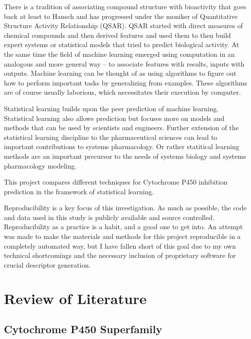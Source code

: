 There is a tradition of associating compound structure with bioactivity that goes back at least to Hansch\cite{Hansch1964} and has progressed under the moniker of Quantitative Structure Activity Relationship (QSAR). QSAR started with direct measures of chemical compounds and then derived features and used them to then build expert systems or statistical models that tried to predict biological activity. At the same time the field of machine learning emerged using computation in an analogous and more general way -- to associate features with results, inputs with outputs. Machine learning can be thought of as using algorithms to figure out how to perform important tasks by generalizing from examples. These algorithms are of course usually laborious, which necessitates their execution by computer.

Statistical learning builds upon the peer prediction of machine learning. Statistical learning also allows prediction but focuses more on models and methods that can be used by scientists and engineers.\cite{James2013} Further extension of the statistical learning discipline to the pharmaceutical sciences can lead to important contributions to systems pharmacology. Or rather statitical learning methods are an important precursor to the needs of systems biology and systems pharmacology modeling.

This project compares different techniques for Cytochrome P450 inhibition prediction in the framework of statistical learning. 

Reproducibility is a key focus of this investigation. As much as possible, the code and data used in this study is publicly available and source controlled. Reproducibility as a practice is a habit, and a good one to get into. An attempt was made to make the materials and methods for this project reproducible in a completely automated way, but I have fallen short of this goal due to my own technical shortcomings and the necessary inclusion of proprietary software for crucial descriptor generation.

\section{Review of Literature}
\subsection{Cytochrome P450 Superfamily}

